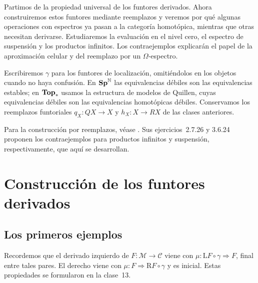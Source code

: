 
Partimos de la propiedad universal de los funtores derivados. Ahora construiremos estos funtores mediante reemplazos y veremos por qué algunas operaciones con espectros ya pasan a la categoría homotópica, mientras que otras necesitan derivarse. Estudiaremos la evaluación en el nivel cero, el espectro de suspensión y los productos infinitos. Los contraejemplos explicarán el papel de la aproximación celular y del reemplazo por un $\Omega$-espectro.

Escribiremos $\gamma$ para los funtores de localización, omitiéndolos en los objetos cuando no haya confusión. En $\mathbf{Sp}^{\mathbb N}$ las equivalencias débiles son las equivalencias estables; en $\mathbf{Top}_*$ usamos la estructura de modelos de Quillen, cuyas equivalencias débiles son las equivalencias homotópicas débiles. Conservamos los reemplazos funtoriales $q_X\colon QX\to X$ y $h_X\colon X\to RX$ de las clases anteriores.

Para la construcción por reemplazos, véase \cite[\S\S3.4.2--3.4.4, especialmente ejemplos~3.4.2.8, 3.4.3.3 y 3.4.4.1]{malkiewich}. Sus ejercicios~2.7.26 y 3.6.24 proponen los contraejemplos para productos infinitos y suspensión, respectivamente, que aquí se desarrollan.

\section{Construcción de los funtores derivados}

\subsection{Los primeros ejemplos}

Recordemos que el derivado izquierdo de $F\colon\mathcal M\to\mathcal C$ viene con $\mu\colon\mathrm LF\circ\gamma\Rightarrow F$, final entre tales pares. El derecho viene con $\mu\colon F\Rightarrow\mathrm RF\circ\gamma$ y es inicial. Estas propiedades se formularon en la clase~13.

